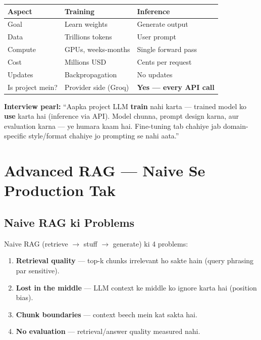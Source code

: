 \begin{longtable}{p{4cm} p{5.2cm} p{5.2cm}}
\toprule
\textbf{Aspect} & \textbf{Training} & \textbf{Inference} \\
\midrule
Goal & Learn weights & Generate output \\
Data & Trillions tokens & User prompt \\
Compute & GPUs, weeks-months & Single forward pass \\
Cost & Millions USD & Cents per request \\
Updates & Backpropagation & No updates \\
Is project mein? & Provider side (Groq) & \textbf{Yes --- every API call} \\
\bottomrule
\end{longtable}

\begin{memorybox}
\textbf{Interview pearl:} ``Aapka project LLM \textbf{train} nahi karta --- trained model ko \textbf{use} karta hai (inference via API). Model chunna, prompt design karna, aur evaluation karna --- ye humara kaam hai. Fine-tuning tab chahiye jab domain-specific style/format chahiye jo prompting se nahi aata.''
\end{memorybox}

\section{Advanced RAG --- Naive Se Production Tak}

\subsection{Naive RAG ki Problems}

\begin{conceptbox}
Naive RAG (retrieve $\rightarrow$ stuff $\rightarrow$ generate) ki 4 problems:
\begin{enumerate}[label=\arabic*.]
\item \textbf{Retrieval quality} --- top-k chunks irrelevant ho sakte hain (query phrasing par sensitive).
\item \textbf{Lost in the middle} --- LLM context ke middle ko ignore karta hai (position bias).
\item \textbf{Chunk boundaries} --- context beech mein kat sakta hai.
\item \textbf{No evaluation} --- retrieval/answer quality measured nahi.
\end{enumerate}
\end{conceptbox}

